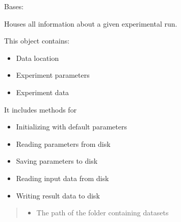 \documentclass[letterpaper,10pt,english]{sphinxmanual}
\begin{document}
\begin{fulllineitems}
\label{\detokenize{lysis.util:lysis.util.parameters.Experiment}}
\pysigstartsignatures
{}
\pysigstopsignatures
\sphinxAtStartPar
Bases: 

\sphinxAtStartPar
Houses all information about a given experimental run.

\sphinxAtStartPar
This object contains:
\begin{itemize}
\item {} 
\sphinxAtStartPar
Data location

\item {} 
\sphinxAtStartPar
Experiment parameters

\item {} 
\sphinxAtStartPar
Experiment data

\end{itemize}

\sphinxAtStartPar
It includes methods for
\begin{itemize}
\item {} 
\sphinxAtStartPar
Initializing with default parameters

\item {} 
\sphinxAtStartPar
Reading parameters from disk

\item {} 
\sphinxAtStartPar
Saving parameters to disk

\item {} 
\sphinxAtStartPar
Reading input data from disk

\item {} 
\sphinxAtStartPar
Writing result data to disk

\end{itemize}
\begin{quote}\begin{description}
\begin{itemize}
\item {} 
\sphinxAtStartPar
{} \textendash{} The path of the folder containing datasets


\end{itemize}
\end{description}
\end{quote}
\end{fulllineitems}
\end{document}

